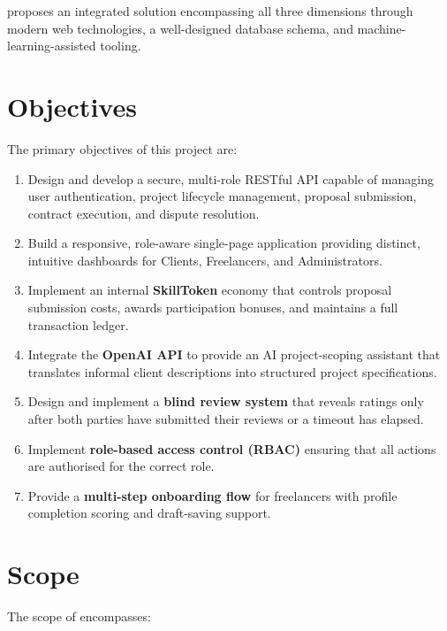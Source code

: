 \projectname{} proposes an integrated solution encompassing all three dimensions through modern web technologies, a well-designed database schema, and machine-learning-assisted tooling.

\section{Objectives}

The primary objectives of this project are:

\begin{enumerate}
  \item Design and develop a secure, multi-role RESTful API capable of managing user authentication, project lifecycle management, proposal submission, contract execution, and dispute resolution.
  \item Build a responsive, role-aware single-page application providing distinct, intuitive dashboards for Clients, Freelancers, and Administrators.
  \item Implement an internal \textbf{SkillToken} economy that controls proposal submission costs, awards participation bonuses, and maintains a full transaction ledger.
  \item Integrate the \textbf{OpenAI API} to provide an AI project-scoping assistant that translates informal client descriptions into structured project specifications.
  \item Design and implement a \textbf{blind review system} that reveals ratings only after both parties have submitted their reviews or a timeout has elapsed.
  \item Implement \textbf{role-based access control (RBAC)} ensuring that all actions are authorised for the correct role.
  \item Provide a \textbf{multi-step onboarding flow} for freelancers with profile completion scoring and draft-saving support.
\end{enumerate}

\section{Scope}

The scope of \projectname{} encompasses:

